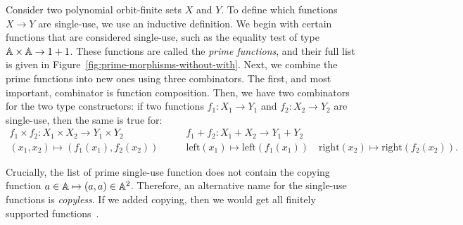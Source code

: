 Consider two polynomial orbit-finite sets $X$ and $Y$. To define which functions $X \to Y$ are single-use, we use an inductive definition. We begin with certain functions that are considered single-use, such as the equality test of type $\mathbb A \times \mathbb A \to 1 + 1$. These functions are called the \emph{prime functions}, and their full list is given in Figure~\ref{fig:prime-morphisms-without-with}. Next, we combine the prime functions into new ones using three combinators. The first, and most important, combinator is  function composition. Then, we have two combinators for the two type constructors: if two functions $f_1 : X_1 \to Y_1$ and $f_2 : X_2 \to Y_2$ are single-use, then the same is true for:
\begin{align*}
    f_1 \times f_2 : X_1 \times X_2 \to Y_1 \times Y_2
    \qquad &
    f_1 + f_2 : X_1 + X_2 \to Y_1 + Y_2 \\
    \scriptstyle  (x_1,x_2) \mapsto (f_1(x_1),f_2(x_2)) 
    \qquad &
    {\scriptstyle \text{left}(x_1) \mapsto \text{left}(f_1(x_1)) 
        \quad 
        \text{right}(x_2) \mapsto \text{right}(f_2(x_2)) }.
\end{align*}

Crucially, the list of prime single-use function does not contain the copying function $a \in \mathbb A \mapsto (a,a) \in \mathbb A^2$. Therefore, an alternative name for the single-use functions is \emph{copyless}. If we added copying, then we would get all finitely supported functions~\cite[Lemma 23]{stefanski-phd}.

